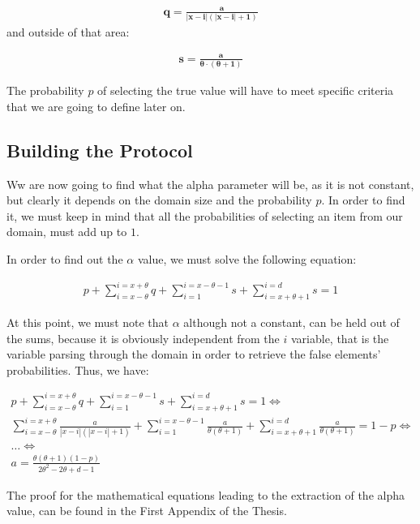 \begin{align}
    \mathbf{q = \frac{a}{|x-i|(|x-i| + 1)}}
\end{align}
and outside of that area:

\begin{align}
    \mathbf{s = \frac{a}{\theta \cdot (\theta + 1)}}
\end{align}

The probability $p$ of selecting the true value will have to meet specific criteria that we are going to define later on.

\subsection{Building the Protocol}
Ww are now going to find what the alpha parameter will be, as it is not constant, but clearly it depends on the domain size and the probability $p$. In order to find it, we must keep in mind that all the probabilities of selecting an item from our domain, must add up to $1$.

In order to find out the $\alpha$ value, we must solve the following equation:

\begin{align*}
    p + \sum_{i = x - \theta}^{i = x + \theta} q + \sum_{i = 1}^{i = x - \theta -1} s + \sum_{i = x + \theta + 1}^{i = d} s = 1
\end{align*}

At this point, we must note that $\alpha$ although not a constant, can be held out of the sums, because it is obviously independent from the $i$ variable, that is the variable parsing through the domain in order to retrieve the false elements' probabilities. Thus, we have:

\begin{align*}
        p + \sum_{i = x - \theta}^{i = x + \theta} q + \sum_{i = 1}^{i = x - \theta -1} s + \sum_{i = x + \theta + 1}^{i = d} s = 1 \Longleftrightarrow \\
      \sum_{i = x - \theta}^{i = x + \theta} \frac{a}{|x-i|(|x-i| + 1)} + \sum_{i = 1}^{i = x - \theta -1} \frac{a}{\theta(\theta+1)} + \sum_{i = x + \theta + 1}^{i = d} \frac{a}{\theta(\theta+1)} = 1 - p \Longleftrightarrow \\ \dots \Longleftrightarrow \\ 
    a = \frac{\theta(\theta + 1) (1 - p)}{2\theta^2 - 2\theta + d - 1}
\end{align*}

The proof for the mathematical equations leading to the extraction of the alpha value, can be found in the First Appendix of the Thesis.

